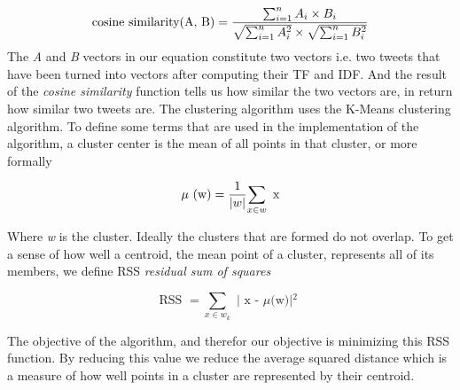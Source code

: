 \begin{equation}
	\text{cosine similarity(A, B)} = {\sum_{i=1}^{n} A_i \times B_i \over
				\sqrt{\sum_{i=1}^{n} A_i^2} \times \sqrt{\sum_{i=1}^{n} B_i^2 }}
\end{equation}
\newline
The \textit{A} and \textit{B} vectors in our equation constitute two vectors i.e. two tweets that have been turned into vectors after computing their TF and IDF. And the result of the \textit{cosine similarity} function tells us how similar the two vectors are, in return how similar two tweets are.
\newline
\newline
The clustering algorithm uses the K-Means clustering algorithm.
To define some terms that are used in the implementation of the algorithm, a cluster center is the mean of all points in that cluster, or more formally

\begin{equation}
\text{ $\mu$ (w)} = { {1 \over |w| } {\sum_{x \in w} \textrm{ x } } }	
\end{equation}


Where \textit{w} is the cluster. Ideally the clusters that are formed do not overlap. To get a sense of how well a centroid, the mean point of a cluster, represents all of its members, we define RSS \textit{residual sum of squares}

\begin{equation}
\text{ RSS } = {{\sum_{x \in w_{k}}} \textrm{ | x - $\mu$(w)|$^{2}$ } }
\end{equation}

The objective of the algorithm, and therefor our objective is minimizing this RSS function. By reducing this value we reduce the average squared distance which is a measure of how well points in a cluster are represented by their centroid.

